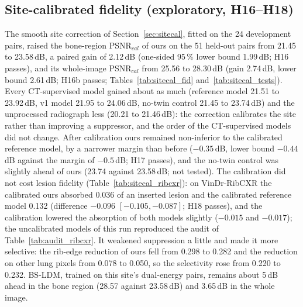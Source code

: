 \subsection{Site-calibrated fidelity (exploratory, \texorpdfstring{H16--H18}{H16-H18})}
\label{sec:res_sitecal}
The smooth site correction of Section~\ref{sec:sitecal}, fitted on the 24 development pairs, raised the bone-region PSNR$_{cal}$ of ours on
the 51 held-out pairs from 21.45 to 23.58\,dB, a paired gain of 2.12\,dB (one-sided 95\,\% lower bound 1.99\,dB; H16 passes), and its
whole-image PSNR$_{cal}$ from 25.56 to 28.30\,dB (gain 2.74\,dB, lower bound 2.61\,dB; H16b passes; Tables~\ref{tab:sitecal_fid}
and~\ref{tab:sitecal_tests}). Every CT-supervised model gained about as much (reference model 21.51 to 23.92\,dB, v1 model 21.95 to
24.06\,dB, no-twin control 21.45 to 23.74\,dB) and the unprocessed radiograph less (20.21 to 21.46\,dB): the correction calibrates the site
rather than improving a suppressor, and the order of the CT-supervised models did not change. After calibration ours remained non-inferior
to the calibrated reference model, by a narrower margin than before ($-0.35$\,dB, lower bound $-0.44$\,dB against the margin of
$-0.5$\,dB; H17 passes), and the no-twin control was slightly ahead of ours (23.74 against 23.58\,dB; not tested). The calibration did
not cost lesion fidelity (Table~\ref{tab:sitecal_ribcxr}): on VinDr-RibCXR the calibrated ours absorbed 0.036 of an inserted lesion and the
calibrated reference model 0.132 (difference $-0.096$ $[-0.105,-0.087]$; H18 passes), and the calibration lowered the absorption of both
models slightly ($-0.015$ and $-0.017$); the uncalibrated models of this run reproduced the audit of Table~\ref{tab:audit_ribcxr}. It
weakened suppression a little and made it more selective: the rib-edge reduction of ours fell from 0.298 to 0.282 and the reduction on other
lung pixels from 0.078 to 0.050, so the selectivity rose from 0.220 to 0.232. BS-LDM, trained on this site's dual-energy pairs, remains
about 5\,dB ahead in the bone region (28.57 against 23.58\,dB) and 3.65\,dB in the whole image.
\begin{table}[htbp]
\centering\small
\caption{Site-calibrated fidelity on the 51 held-out SZCH-X-Rays pairs (exploratory, SAP\_v5): every method as is and with the smooth site
correction of Eq.~\eqref{eq:sitecal} fitted on the 24 development pairs. BS-LDM, trained on this site's dual-energy pairs, is not
corrected.}
\label{tab:sitecal_fid}
\end{table}
